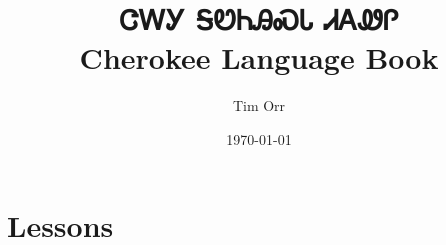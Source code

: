 \documentclass{book}
\begin{document}
    \title{\Huge\bf ᏣᎳᎩ ᎦᏬᏂᎯᏍᏓ ᏗᎪᏪᎵ\\Cherokee Language Book}
    \author{Tim Orr}
    \date{\today}
    \maketitle

    \tableofcontents

\part{Lessons}

\setcounter{secnumdepth}{0}










%







\printindex
\end{document}
